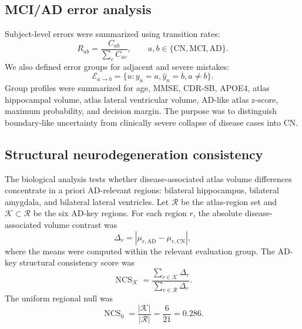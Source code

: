 \documentclass[12pt,a4paper]{article}
\begin{document}
\subsection{MCI/AD error analysis}
\label{sec:error_methods}

Subject-level errors were summarized using transition rates:
\begin{equation}
R_{ab}=
\frac{C_{ab}}{\sum_c C_{ac}},
\qquad
a,b\in\{\mathrm{CN},\mathrm{MCI},\mathrm{AD}\}.
\label{eq:transition_rates}
\end{equation}
We also defined error groups for adjacent and severe mistakes:
\begin{equation}
\mathcal{E}_{a\rightarrow b}
=
\{u:y_u=a,\hat{y}_u=b,a\neq b\}.
\label{eq:error_groups}
\end{equation}
Group profiles were summarized for age, MMSE, CDR-SB, APOE4, atlas hippocampal volume, atlas lateral ventricular volume, AD-like atlas z-score, maximum probability, and decision margin. The purpose was to distinguish boundary-like uncertainty from clinically severe collapse of disease cases into CN.

\subsection{Structural neurodegeneration consistency}
\label{sec:bio}

The biological analysis tests whether disease-associated atlas volume differences concentrate in a priori AD-relevant regions: bilateral hippocampus, bilateral amygdala, and bilateral lateral ventricles. Let $\mathcal{R}$ be the atlas-region set and $\mathcal{K}\subset\mathcal{R}$ be the six AD-key regions. For each region $r$, the absolute disease-associated volume contrast was
\begin{equation}
\Delta_r =
\left|
\mu_{r,\mathrm{AD}}-\mu_{r,\mathrm{CN}}
\right|,
\label{eq:region_delta}
\end{equation}
where the means were computed within the relevant evaluation group. The AD-key structural consistency score was
\begin{equation}
\operatorname{NCS}_{\mathcal{K}}
=
\frac{\sum_{r\in\mathcal{K}}\Delta_r}
{\sum_{r\in\mathcal{R}}\Delta_r}.
\label{eq:ncs}
\end{equation}
The uniform regional null was
\begin{equation}
\operatorname{NCS}_{0}=
\frac{|\mathcal{K}|}{|\mathcal{R}|}
=
\frac{6}{21}=0.286.
\label{eq:ncs_null}
\end{equation}
\end{document}
